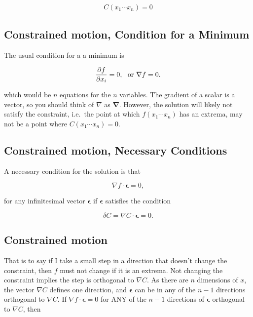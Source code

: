 \documentclass[%
oneside,                 %
final,                   %
10pt]{article}
\begin{document}
\begin{eqnarray}
C(x_1\cdots x_n)=0
\end{eqnarray}

\subsection*{Constrained motion, Condition for a Minimum}

The usual condition for a a minimum is

\begin{eqnarray}
\frac{\partial f}{\partial x_i}=0{\rm ,~~or~}\nabla f=0.
\end{eqnarray}

which would be $n$ equations for the $n$ variables. The gradient of a
scalar is a vector, so you should think of $\nabla$ as
$\bm{\nabla}$. However, the solution will likely not satisfy the
constraint, i.e.~the point at which $f(x_1\cdots x_n)$ has an extrema,
may not be a point where $C(x_1\cdots x_n)=0$.

\subsection*{Constrained motion, Necessary Conditions}

A necessary condition for the solution is that

\begin{equation}
\nabla f\cdot\bm{\epsilon}=0,
\end{equation}

for any infinitesimal vector $\bm{\epsilon}$ if $\bm{\epsilon}$
satisfies the condition

\begin{equation}
\delta C=\nabla C\cdot\bm{\epsilon}=0.
\end{equation}

\subsection*{Constrained motion}

That is to say if I take a small step in a direction that doesn't
change the constraint, then $f$ must not change if it is an
extrema. Not changing the constraint implies the step is orthogonal to
$\nabla C$. As there are $n$ dimensions of $x$, the vector $\nabla C$
defines one direction, and $\bm{\epsilon}$ can be in any of the $n-1$
directions orthogonal to $\nabla C$. If $\nabla f\cdot\bm{\epsilon}=0$
for ANY of the $n-1$ directions of $\bm{\epsilon}$ orthogonal to
$\nabla C$, then
\end{document}
